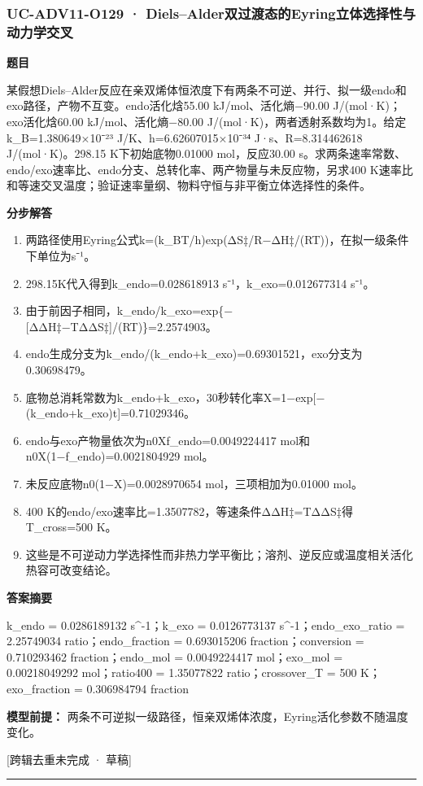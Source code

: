 \documentclass[UTF8,11pt,a4paper]{ctexart}
\begin{document}
\subsubsection*{UC-ADV11-O129 · Diels–Alder双过渡态的Eyring立体选择性与动力学交叉}
\noindent\textbf{题目}\par
某假想Diels–Alder反应在亲双烯体恒浓度下有两条不可逆、并行、拟一级endo和exo路径，产物不互变。endo活化焓55.00 kJ/mol、活化熵−90.00 J/(mol·K)；exo活化焓60.00 kJ/mol、活化熵−80.00 J/(mol·K)，两者透射系数均为1。给定k\_B=1.380649×10⁻²³ J/K、h=6.62607015×10⁻³⁴ J·s、R=8.314462618 J/(mol·K)。298.15 K下初始底物0.01000 mol，反应30.00 s。求两条速率常数、endo/exo速率比、endo分支、总转化率、两产物量与未反应物，另求400 K速率比和等速交叉温度；验证速率量纲、物料守恒与非平衡立体选择性的条件。\par
\medskip\noindent\textbf{分步解答}
\begin{enumerate}
\item 两路径使用Eyring公式k=(k\_BT/h)exp(ΔS‡/R−ΔH‡/(RT))，在拟一级条件下单位为s⁻¹。
\item 298.15K代入得到k\_endo=0.028618913 s⁻¹，k\_exo=0.012677314 s⁻¹。
\item 由于前因子相同，k\_endo/k\_exo=exp\{−[ΔΔH‡−TΔΔS‡]/(RT)\}=2.2574903。
\item endo生成分支为k\_endo/(k\_endo+k\_exo)=0.69301521，exo分支为0.30698479。
\item 底物总消耗常数为k\_endo+k\_exo，30秒转化率X=1−exp[−(k\_endo+k\_exo)t]=0.71029346。
\item endo与exo产物量依次为n0Xf\_endo=0.0049224417 mol和n0X(1−f\_endo)=0.0021804929 mol。
\item 未反应底物n0(1−X)=0.0028970654 mol，三项相加为0.01000 mol。
\item 400 K的endo/exo速率比=1.3507782，等速条件ΔΔH‡=TΔΔS‡得T\_cross=500 K。
\item 这些是不可逆动力学选择性而非热力学平衡比；溶剂、逆反应或温度相关活化热容可改变结论。
\end{enumerate}
\noindent\textbf{答案摘要}\par
k\_endo = 0.0286189132 s\textasciicircum{}-1；k\_exo = 0.0126773137 s\textasciicircum{}-1；endo\_exo\_ratio = 2.25749034 ratio；endo\_fraction = 0.693015206 fraction；conversion = 0.710293462 fraction；endo\_mol = 0.0049224417 mol；exo\_mol = 0.00218049292 mol；ratio400 = 1.35077822 ratio；crossover\_T = 500 K；exo\_fraction = 0.306984794 fraction\par
\noindent\textbf{模型前提：}
两条不可逆拟一级路径，恒亲双烯体浓度，Eyring活化参数不随温度变化。\par
\noindent\textcolor{red!65!black}{[跨辑去重未完成 · 草稿]} \par
\medskip\hrule\medskip
{}
\end{document}
